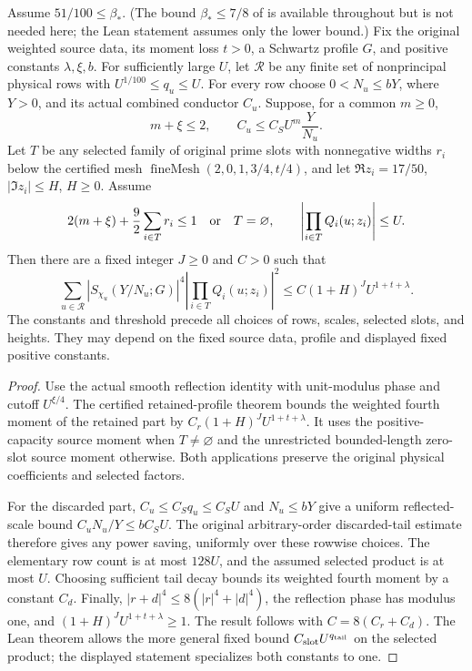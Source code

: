\begin{proposition}\label{prop:checked-original-fourth}
Assume $51/100\le\beta_*$. \textup{(}The bound $\beta_*\le7/8$ of
\cite{openai} is available throughout but is not needed here; the Lean
statement assumes only the lower bound.\textup{)}
Fix the original weighted source data, its moment loss $t>0$, a
Schwartz profile $G$, and positive constants $\lambda,\xi,b$.
For sufficiently large $U$, let $\mathcal R$ be any finite set of
nonprincipal physical rows with $U^{1/100}\le q_u\le U$.
For every row choose $0<N_u\le bY$, where $Y>0$, and its actual
combined conductor $C_u$. Suppose, for a common $m\ge0$,
\[
 m+\xi\le2,\qquad
 C_u\le C_S U^m\frac{Y}{N_u}.
\]
Let $T$ be any selected family of original prime slots with nonnegative
widths $r_i$ below the certified mesh
$\operatorname{fineMesh}(2,0,1,3/4,t/4)$, and let
$\Re z_i=17/50$, $|\Im z_i|\le H$, $H\ge0$. Assume
\[
 2(m+\xi)+\frac92\sum_{i\in T}r_i\le1
 \quad\hbox{or}\quad T=\varnothing,
 \qquad
 \left|\prod_{i\in T}Q_i(u;z_i)\right|\le U.
\]
Then there are a fixed integer $J\ge0$ and $C>0$ such that
\[
 \sum_{u\in\mathcal R}
 \left|S_{\chi_u}(Y/N_u;G)\right|^4
 \left|\prod_{i\in T}Q_i(u;z_i)\right|^2
 \le C(1+H)^J U^{1+t+\lambda}.
\]
The constants and threshold precede all choices of rows, scales,
selected slots, and heights. They may depend on the fixed source data,
profile and displayed fixed positive constants.
\end{proposition}
\begin{proof}
Use the actual smooth reflection identity with unit-modulus phase and
cutoff $U^{\xi/4}$. The certified retained-profile theorem bounds the
weighted fourth moment of the retained part by
$C_r(1+H)^J U^{1+t+\lambda}$. It uses the positive-capacity source
moment when $T\ne\varnothing$ and the unrestricted bounded-length
zero-slot source moment otherwise. Both applications preserve the
original physical coefficients and selected factors.

For the discarded part, $C_u\le C_S q_u\le C_SU$ and $N_u\le bY$
give a uniform reflected-scale bound $C_uN_u/Y\le bC_SU$.
The original arbitrary-order discarded-tail estimate therefore gives
any power saving, uniformly over these rowwise choices. The elementary
row count is at most $128U$, and the assumed selected product is at
most $U$. Choosing sufficient tail decay bounds its weighted fourth
moment by a constant $C_d$. Finally,
$|r+d|^4\le8(|r|^4+|d|^4)$, the reflection phase has modulus one,
and $(1+H)^J U^{1+t+\lambda}\ge1$. The result follows with
$C=8(C_r+C_d)$. The Lean theorem allows the more general fixed bound
$C_{\rm slot}U^{q_{\rm tail}}$ on the selected product; the displayed
statement specializes both constants to one.
\end{proof}

